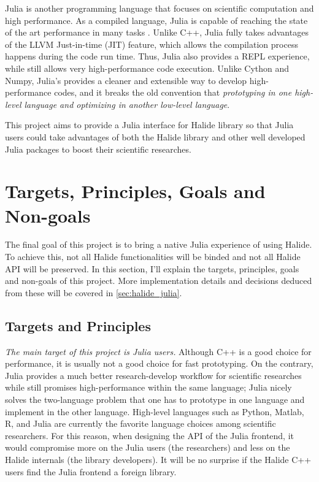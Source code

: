 \documentclass{article}
\begin{document}
Julia\cite{bezanson2017julia} is another programming language that focuses on scientific computation and high performance. As a compiled language, Julia is capable of reaching the state of the art performance in many tasks \cite{julia_benchmark}. Unlike C++, Julia fully takes advantages of the LLVM\cite{lattner2004llvm} Just-in-time (JIT) feature, which allows the compilation process happens during the code run time. Thus, Julia also provides a REPL experience, while still allows very high-performance code execution. Unlike Cython and Numpy, Julia's provides a cleaner and extensible way to develop high-performance codes, and it breaks the old convention that \emph{prototyping in one high-level language and optimizing in another low-level language}.

This project aims to provide a Julia interface for Halide library so that Julia users could take advantages of both the Halide library and other well developed Julia packages to boost their scientific researches.


\section{Targets, Principles, Goals and Non-goals}

The final goal of this project is to bring a native Julia experience of using Halide. To achieve this, not all Halide functionalities will be binded and not all Halide API will be preserved. In this section, I'll explain the targets, principles, goals and non-goals of this project. More implementation details and decisions deduced from these will be covered in \cref{sec:halide_julia}.

\subsection{Targets and Principles}

\emph{The main target of this project is Julia users.} Although C++ is a good choice for performance, it is usually not a good choice for fast prototyping. On the contrary, Julia provides a much better research-develop workflow for scientific researches while still promises high-performance within the same language; Julia nicely solves the two-language problem that one has to prototype in one language and implement in the other language. High-level languages such as Python, Matlab, R, and Julia are currently the favorite language choices among scientific researchers. For this reason, when designing the API of the Julia frontend, it would compromise more on the Julia users (the researchers) and less on the Halide internals (the library developers). It will be no surprise if the Halide C++ users find the Julia frontend a foreign library.
\end{document}
